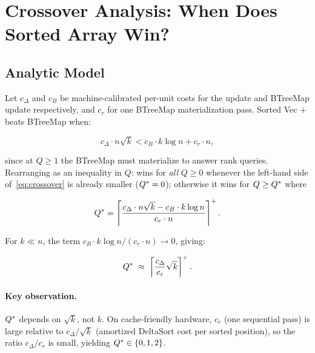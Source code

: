 \section{Crossover Analysis: When Does Sorted Array Win?}
\label{sec:crossover}

\subsection{Analytic Model}

Let $c_\Delta$ and $c_B$ be machine-calibrated per-unit costs for the
\DeltaSort update and BTreeMap update respectively, and $c_r$ for one
BTreeMap materialization pass.
Sorted Vec + \DeltaSort beats BTreeMap when:

\begin{equation}
  c_\Delta \cdot n\sqrt{k}
    < c_B \cdot k\log n + c_r \cdot n ,
  \label{eq:crossover}
\end{equation}

since at $Q \geq 1$ the BTreeMap must materialize to answer rank queries.
Rearranging as an inequality in $Q$: \DeltaSort wins for \emph{all} $Q \geq 0$
whenever the left-hand side of~\eqref{eq:crossover} is already smaller
($Q^* = 0$); otherwise it wins for $Q \geq Q^*$ where

\begin{equation}
  Q^* = \left\lceil
    \frac{c_\Delta \cdot n\sqrt{k} - c_B \cdot k\log n}{c_r \cdot n}
  \right\rceil^+ .
  \label{eq:qbreak}
\end{equation}

For $k \ll n$, the term $c_B \cdot k\log n / (c_r \cdot n) \to 0$, giving:

\begin{equation}
  Q^* \;\approx\; \left\lceil \frac{c_\Delta}{c_r} \sqrt{k} \right\rceil^+ .
  \label{eq:qbreak-approx}
\end{equation}

\paragraph{Key observation.}
$Q^*$ depends on $\sqrt{k}$, not $k$.
On cache-friendly hardware, $c_r$ (one sequential pass) is large relative to
$c_\Delta / \sqrt{k}$ (amortized DeltaSort cost per sorted position), so the
ratio $c_\Delta / c_r$ is small, yielding $Q^* \in \{0, 1, 2\}$.

